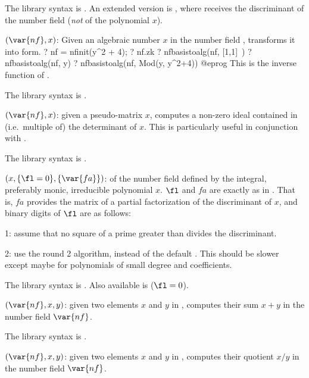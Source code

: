 The library syntax is .
An extended version is
, where 
receives the discriminant of the number field
(\emph{not} of the polynomial $x$).

$(\var{nf},x)$: \label{se:nfbasistoalg}Given an algebraic number $x$ in the number field , transforms it
into  form.
\bprog
? nf = nfinit(y^2 + 4);
? nf.zk
? nfbasistoalg(nf, [1,1]~)
? nfbasistoalg(nf, y)
? nfbasistoalg(nf, Mod(y, y^2+4))
@eprog
This is the inverse function of .

The library syntax is .

$(\var{nf},x)$: \label{se:nfdetint}given a pseudo-matrix $x$, computes a
non-zero ideal contained in (i.e.~multiple of) the determinant of $x$. This
is particularly useful in conjunction with .

The library syntax is .

$(x,\{\fl=0\},\{\var{fa}\})$: \label{se:nfdisc} of the number field defined by the integral,
preferably monic, irreducible polynomial $x$. $\fl$ and $fa$ are exactly as
in . That is, $fa$ provides the matrix of a partial
factorization of the discriminant of $x$, and binary digits of $\fl$ are as
follows:

1: assume that no square of a prime greater than 
divides the discriminant.

2: use the round 2 algorithm, instead of the default . This
should be slower except maybe for polynomials of small degree and
coefficients.

The library syntax is .
Also available is  ($\fl=0$).

$(\var{nf},x,y)$: \label{se:nfeltadd}
given two elements $x$ and $y$ in
, computes their sum $x+y$ in the number field $\var{nf}$.

The library syntax is .

$(\var{nf},x,y)$: \label{se:nfeltdiv}given two elements $x$ and $y$ in
, computes their quotient $x/y$ in the number field $\var{nf}$.

